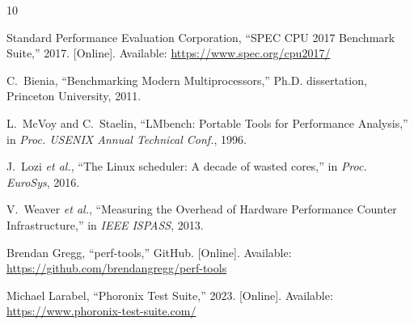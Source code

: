 \documentclass[conference]{IEEEtran}
\begin{document}
\balance
\begin{thebibliography}{10}

Standard Performance Evaluation Corporation,
``SPEC CPU 2017 Benchmark Suite,'' 2017.
[Online]. Available: \url{https://www.spec.org/cpu2017/}

C.~Bienia, ``Benchmarking Modern Multiprocessors,''
Ph.D. dissertation, Princeton University, 2011.

L.~McVoy and C.~Staelin,
``LMbench: Portable Tools for Performance Analysis,''
in \textit{Proc. USENIX Annual Technical Conf.}, 1996.

J.~Lozi \textit{et al.},
``The Linux scheduler: A decade of wasted cores,''
in \textit{Proc. EuroSys}, 2016.

V.~Weaver \textit{et al.},
``Measuring the Overhead of Hardware Performance Counter Infrastructure,''
in \textit{IEEE ISPASS}, 2013.

Brendan Gregg, ``perf-tools,'' GitHub.
[Online]. Available: \url{https://github.com/brendangregg/perf-tools}

Michael Larabel, ``Phoronix Test Suite,'' 2023.
[Online]. Available: \url{https://www.phoronix-test-suite.com/}

\end{thebibliography}
\end{document}
